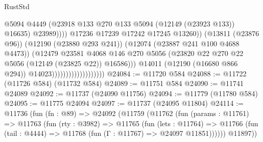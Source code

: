 \begin{lexlean}{RustStd}
\begin{coremodule}
                                                        @5094
                                                        @4449
                                                        (@23918
                                                          @133
                                                          @270
                                                          @133
                                                          @5094
                                                          (@12149 (@23923 @133))
                                                          @16635)
                                                        @23989))))
                                                @17236
                                                @17239
                                                @17242
                                                @17245
                                                @13260))
                                            (@13811 (@23876 @96))
                                            (@12190 (@23880 @293 @241))
                                            (@12074 (@23887 @241 @100 @4688 @4473))
                                            (@12479
                                              @23581
                                              @4068
                                              @146
                                              @270
                                              @5056
                                              (@23820
                                                @22
                                                @270
                                                @22
                                                @5056
                                                (@12149 (@23825 @22))
                                                @16586)))
                                          @14011
                                          (@12190 (@16680 @866 @294))
                                          @14023)))))))))))))))))))
@24084 := @11720 @584
@24088 := @11722 (@11726 @584) (@11732 @584)
@24089 := @11751 @584
@24090 := @11741 @24089
@24092 := @11737 (@24090 @11756)
@24094 := @11779 (@11780 @584)
@24095 := @11775 @24094
@24097 := @11737 (@24095 @11804)
@24114 := @11736
    (fun (fn : @89) =>
    @24092
      (@11759
        (@11762
          (fun (params : @11761) =>
          @11763
            (fun (rty : @3982) =>
            @11765
              (fun (lets : @11764) =>
              @11766 (fun (tail : @4444) => @11768 (fun (Γ : @11767) => @24097 @11851))))))
        @11897))

\end{coremodule}
\end{lexlean}
